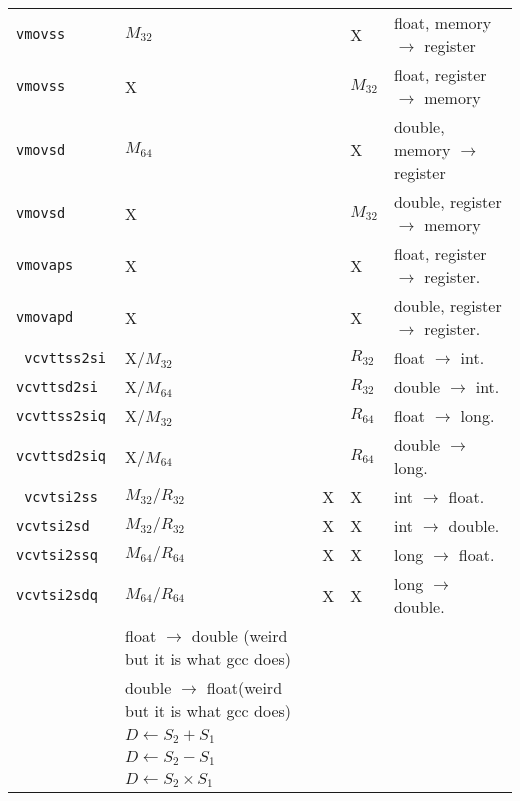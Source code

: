 \begin{center}
\tablefirsthead{}
\tablelasttail{}
\begin{supertabular}{>{\tt}m{80pt}C{36pt}C{17pt}C{17pt}m{160pt}}\toprule
vmovss & $M_{32}$ && X & float, memory $\rightarrow$ register\\
vmovss & X && $M_{32}$ & float, register $\rightarrow$ memory\\
vmovsd & $M_{64}$ && X & double, memory $\rightarrow$ register\\
vmovsd & X && $M_{32}$ & double, register $\rightarrow$ memory\\
vmovaps & X && X & float, register $\rightarrow$ register.\\
vmovapd & X && X & double, register $\rightarrow$ register. \\\midrule
vcvttss2si & X/$M_{32}$ && $R_{32}$ & float $\rightarrow$ int.\\
vcvttsd2si & X/$M_{64}$ && $R_{32}$ & double $\rightarrow$ int. \\
vcvttss2siq & X/$M_{32}$ && $R_{64}$ & float $\rightarrow$ long. \\
vcvttsd2siq & X/$M_{64}$ && $R_{64}$ & double $\rightarrow$ long. \\\midrule
vcvtsi2ss & $M_{32}/R_{32}$ & X & X & int $\rightarrow$ float.\\
vcvtsi2sd & $M_{32}/R_{32}$ & X & X & int $\rightarrow$ double.\\
vcvtsi2ssq & $M_{64}/R_{64}$ & X & X & long $\rightarrow$ float.\\
vcvtsi2sdq & $M_{64}/R_{64}$ & X & X & long $\rightarrow$ double.\\
 & float $\rightarrow$ double (weird but it is what gcc does)\\
 & double $\rightarrow$ float(weird but it is what gcc does)\\\midrule
{} & $D\leftarrow S_2+S_1$\\
 & $D\leftarrow S_2-S_1$\\
 & $D\leftarrow S_2\times S_1$\\

\end{supertabular}
\end{center}
